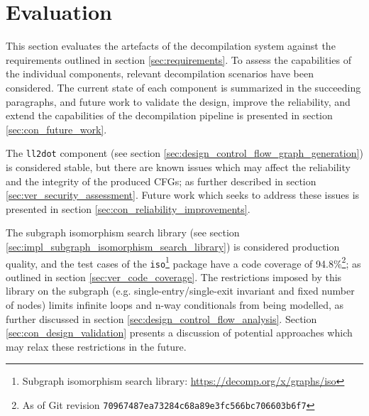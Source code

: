 
%

%
%

\section{Evaluation}
\label{sec:evaluation}

This section evaluates the artefacts of the decompilation system against the requirements outlined in section \ref{sec:requirements}. To assess the capabilities of the individual components, relevant decompilation scenarios have been considered. The current state of each component is summarized in the succeeding paragraphs, and future work to validate the design, improve the reliability, and extend the capabilities of the decompilation pipeline is presented in section \ref{sec:con_future_work}.

The \texttt{ll2dot} component (see section \ref{sec:design_control_flow_graph_generation}) is considered stable, but there are known issues which may affect the reliability and the integrity of the produced CFGs; as further described in section \ref{sec:ver_security_assessment}. Future work which seeks to address these issues is presented in section \ref{sec:con_reliability_improvements}.

The subgraph isomorphism search library (see section \ref{sec:impl_subgraph_isomorphism_search_library}) is considered production quality, and the test cases of the \texttt{iso}\footnote{Subgraph isomorphism search library: \url{https://decomp.org/x/graphs/iso}} package have a code coverage of 94.8\%\footnote{As of Git revision \texttt{70967487ea73284c68a89e3fc566bc706603b6f7}}; as outlined in section \ref{sec:ver_code_coverage}. The restrictions imposed by this library on the subgraph (e.g. single-entry/single-exit invariant and fixed number of nodes) limits infinite loops and n-way conditionals from being modelled, as further discussed in section \ref{sec:design_control_flow_analysis}. Section \ref{sec:con_design_validation} presents a discussion of potential approaches which may relax these restrictions in the future.

